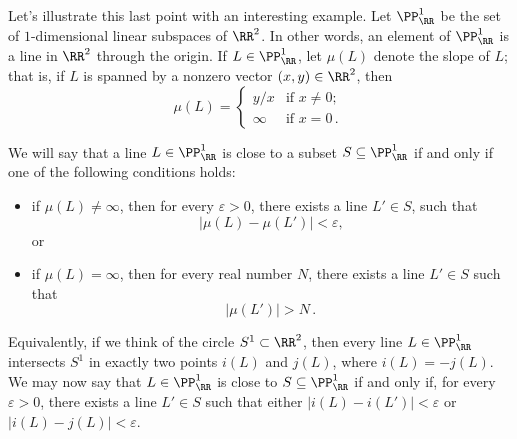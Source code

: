 \begin{exm}%
\label{exm:real_projective_line}
	Let's illustrate this last point with an interesting example.
	Let $\PP^1_{\RR}$ be the set of $1$-dimensional linear subspaces of $\RR^2$.
	In other words, an element of $\PP^1_{\RR}$ is a line in $\RR^2$ through the origin.
	If $L \in \PP^1_{\RR}$, let $\mu(L)$ denote the slope of $L$;
	that is, if $L$ is spanned by a nonzero vector $(x,y) \in \RR^2$, then
	\[
		\mu(L) = \begin{cases}
			y/x & \text{if }x \neq 0\text{;}\\
			\infty & \text{if }x=0 \period
		\end{cases}
	\]

	We will say that a line $L \in \PP^1_{\RR}$ is close to a subset $S \subseteq \PP^1_{\RR}$ if and only if one of the following conditions holds:
	\begin{itemize}
		\item if $\mu(L) \neq \infty$, then for every $\varepsilon>0$, there exists a line $L' \in S$, such that
			\[
				|\mu(L) - \mu(L')| < \varepsilon \comma
			\]
			or
		\item if $\mu(L) = \infty$, then for every real number $N$, there exists a line $L' \in S $ such that
			\[
				|\mu(L')|>N \period
			\]
	\end{itemize}

	Equivalently, if we think of the circle $S^1 \subset \RR^2$, then every line $L \in \PP^1_{\RR}$ intersects $S^1$ in exactly two points%
	$i(L)$ and $j(L)$, where $i(L) = -j(L)$.
	We may now say that $L \in \PP^1_{\RR}$ is close to $S \subseteq \PP^1_{\RR}$ if and only if, for every $\varepsilon>0$, there exists a line $L' \in S$ such that either $|i(L)-i(L')|<\varepsilon$ or $|i(L)-j(L)|<\varepsilon$.
\end{exm}

